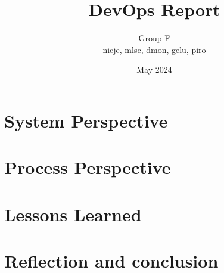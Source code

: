 \documentclass[12pt,a4paper]{report}
\title{DevOps Report}
\author{Group F \\ nicje, mlsc, dmon, gelu, piro}
\date{May 2024}
\begin{document}
\maketitle
\tableofcontents
\listoffigures

\pagebreak


\chapter{System Perspective}






\chapter{Process Perspective}








\chapter{Lessons Learned}


\chapter{Reflection and conclusion}


\end{document}
